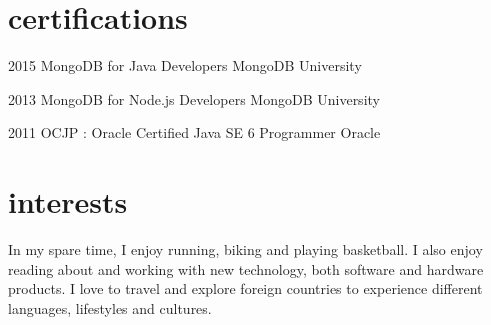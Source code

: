 \documentclass[]{friggeri-cv} %
\begin{document}

\section{certifications}

\begin{entrylist}


\entry
{2015}
{MongoDB for Java Developers}
{MongoDB University}
{}
{}

\entry
{2013}
{MongoDB for Node.js Developers}
{MongoDB University}
{}
{}

\entry
{2011}
{OCJP : Oracle Certified Java SE 6 Programmer}
{Oracle}
{}
{}


\end{entrylist}


\section{interests}

In my spare time, I enjoy running, biking and playing basketball. I also enjoy reading about and working
with new technology, both software and hardware products. I love to travel and explore foreign countries to experience different languages, lifestyles and cultures.
\end{document}
